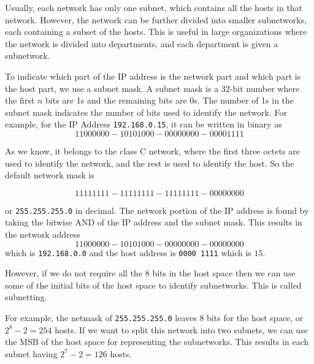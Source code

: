 Usually, each network has only one subnet, which
contains all the hosts in that network. However,
the network can be further divided into smaller
subnetworks, each containing a subset of the hosts.
This is useful in large organizations where the
network is divided into departments, and each
department is given a subnetwork.

To indicate which part of the IP address is the
network part and which part is the host part, we
use a subnet mask. A subnet mask is a 32-bit
number where the first $n$ bits are 1s and the
remaining bits are 0s. The number of 1s in the
subnet mask indicates the number of bits used
to identify the network. For example, for the
IP Address \lstinline|192.168.0.15|, it can be
written in binary as
\[
1100 0000 - 1010 1000 - 0000 0000 - 0000 1111
\]

As we know, it belongs to the class C network,
where the first three octets are used to identify
the network, and the rest is used to identify the
host. So the default network mask is

\[
1111 1111 - 1111 1111 - 1111 1111 - 0000 0000
\]

or \lstinline|255.255.255.0| in decimal.
The network portion of the IP address is
found by taking the bitwise AND
of the IP address and the subnet mask.
This results in the network address
\[
1100 0000 - 1010 1000 - 0000 0000 - 0000 0000
\]
which is \lstinline|192.168.0.0| and the host address
is \lstinline|0000 1111| which is $15$.

However, if we do not require all the 8 bits in the
host space
then we can use some of the initial bits of the
host space to identify subnetworks. This is called
subnetting.

For example, the netmask of \lstinline|255.255.255.0|
leaves 8 bits for the host space, or $2^8 - 2 = 254$
hosts. If we want to split this network into
two subnets, we can use the MSB of the host space
for representing the subnetworks. This results in
each subnet having $2^7 - 2 = 126$ hosts.

